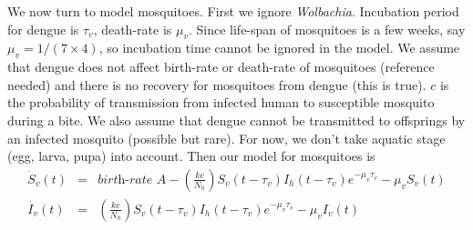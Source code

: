 \documentclass[12pt,leqno]{article}
\begin{document}
We now turn to model mosquitoes. First we ignore {\it Wolbachia}. Incubation period for dengue is $\tau_v$, death-rate is $\mu_v$. Since life-span of mosquitoes is a few weeks, say $\mu_v = 1/(7\times 4)$, so incubation time cannot be ignored in the model. We assume that dengue does not affect birth-rate or death-rate of mosquitoes (reference needed) and there is no recovery for mosquitoes from dengue (this is true). $c$ is the probability of transmission from infected human to susceptible mosquito during a bite. We also assume that dengue cannot be transmitted to offsprings by an infected mosquito (possible but rare). For now, we don't take aquatic stage (egg, larva, pupa) into account. Then our model for mosquitoes is
\begin{eqnarray}\label{dengue}
\dot{S}_v(t) &=& \textit{birth-rate A} - \left(\frac{k c}{N_h}\right) S_v(t-\tau_v)I_h(t-\tau_v)e^{-\mu_v\tau_v} - \mu_v S_v(t)\nonumber\\
\dot{I_v}(t) &=& \left(\frac{k c}{N_h}\right)S_v(t-\tau_v)I_h(t-\tau_v)e^{-\mu_v\tau_v} - \mu_v I_v(t)\nonumber
\end{eqnarray} 
\end{document}
